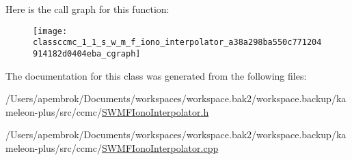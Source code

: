 Here is the call graph for this function\-:\nopagebreak
\begin{figure}[H]
\begin{center}
\leavevmode
\texttt{[image: classccmc\_1\_1\_s\_w\_m\_f\_iono\_interpolator\_a38a298ba550c771204914182d0404eba\_cgraph]}
\end{center}
\end{figure}




The documentation for this class was generated from the following files\-:\begin{DoxyCompactItemize}
\item 
/\-Users/apembrok/\-Documents/workspaces/workspace.\-bak2/workspace.\-backup/kameleon-\/plus/src/ccmc/\hyperlink{_s_w_m_f_iono_interpolator_8h}{S\-W\-M\-F\-Iono\-Interpolator.\-h}\item 
/\-Users/apembrok/\-Documents/workspaces/workspace.\-bak2/workspace.\-backup/kameleon-\/plus/src/ccmc/\hyperlink{_s_w_m_f_iono_interpolator_8cpp}{S\-W\-M\-F\-Iono\-Interpolator.\-cpp}\end{DoxyCompactItemize}
